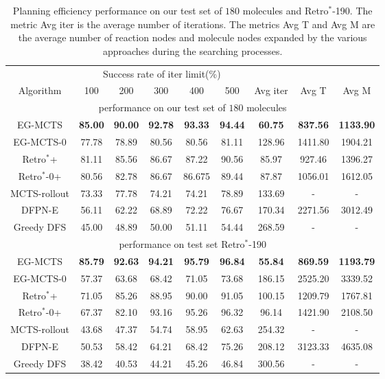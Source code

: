 \documentclass[sn-mathphys,Numbered]{sn-jnl}
\begin{document}
\begin{table}[!ht]
\caption{Planning efficiency performance on our test set of $180$ molecules and Retro$^*$-190. The metric Avg iter is the average number of iterations. The metrics Avg T and Avg M are the average number of reaction nodes and molecule nodes expanded by the various approaches during the searching processes.  }
\label{table-efficiency}

  \centering
  \begin{tabular}{ccccccccc}
    \toprule
    & \multicolumn{5}{c}{Success rate of iter limit(\%)}  \\
    \cmidrule(r){2-6}
    Algorithm   & 100  & 200  & 300  & 400  & 500  & Avg iter & Avg T & Avg M\\
    \midrule
    \multicolumn{9}{c}{performance on our test set of $180$ molecules}  \\
    \midrule
    EG-MCTS     & \textbf{85.00} & \textbf{90.00} & \textbf{92.78} & \textbf{93.33} & \textbf{94.44}  & \textbf{60.75}  & \textbf{837.56}         & \textbf{1133.90}\\
    EG-MCTS-0               & 77.78 & 78.89 & 80.56 & 80.56 & 81.11        & 128.96   & 1411.80                  & 1904.21\\
    Retro$^*$+                  & 81.11 & 85.56 & 86.67 & 87.22 & 90.56    & 85.97   & 927.46     & 1396.27 \\
    Retro$^*$-0+                & 80.56 & 82.78 & 86.67 & 86.675 & 89.44        & 87.87   & 1056.01                 & 1612.05 \\
    MCTS-rollout      & 73.33 & 77.78 & 74.21 & 74.21 & 78.89        & 133.69   & -                 & -\\
    DFPN-E     & 56.11 & 62.22 & 68.89 & 72.22 & 76.67        & 170.34   & 2271.56     & 3012.49  \\
    Greedy DFS      & 45.00 & 48.89 & 50.00 & 51.11 & 54.44        & 268.59   & -      & -    \\
    \midrule
    \multicolumn{9}{c}{performance on test set Retro$^*$-190}  \\
    \midrule
    EG-MCTS     & \textbf{85.79} & \textbf{92.63} & \textbf{94.21} & \textbf{95.79} & \textbf{96.84}        & \textbf{55.84 }    & \textbf{869.59 }                & \textbf{1193.79}\\
    EG-MCTS-0               & 57.37 & 63.68 & 68.42 & 71.05 & 73.68        & 186.15  & 2525.20                  & 3339.52\\
    Retro$^*$+       & 71.05 & 85.26 & 88.95 & 90.00 & 91.05   & 100.15   & 1209.79         & 1767.81 \\
    Retro$^*$-0+               & 67.37 & 82.10 & 93.16 & 95.26 & 96.32        & 96.14   & 1421.90                 & 2108.50 \\
    MCTS-rollout      & 43.68 & 47.37 & 54.74 & 58.95 & 62.63     & 254.32   & -   & -\\
    DFPN-E       & 50.53 & 58.42 & 64.21 & 68.42 & 75.26    & 208.12   & 3123.33       & 4635.08  \\
    Greedy DFS              & 38.42 & 40.53 & 44.21 & 45.26 & 46.84        & 300.56   & -                 & -    \\
    \bottomrule  
    

\end{tabular}
\end{table}
\end{document}
